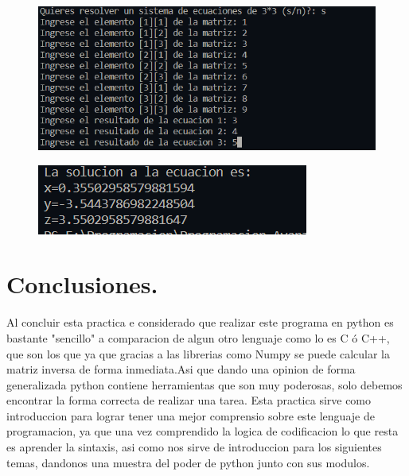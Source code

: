 \documentclass[12pt]{article}
\begin{document}
	\begin{figure}[H]
		\begin{center}
 			\includegraphics[width = .6\textwidth]{1_9.png}
		\end{center} 
	\end{figure}
	\begin{figure}[H]
		\begin{center}
 			\includegraphics[width = .6\textwidth]{1_10.png}
		\end{center} 
	\end{figure}
	
	


\section{Conclusiones.}
Al concluir esta practica e considerado que realizar este programa en python es bastante "sencillo" a comparacion de algun otro lenguaje como lo es C ó C++, que son los que ya que gracias a las librerias como Numpy se puede calcular la matriz inversa de forma inmediata.Asi que dando una opinion de forma generalizada python contiene herramientas que son muy poderosas, solo debemos encontrar la forma correcta de realizar una tarea. Esta practica sirve como introduccion  para lograr tener una mejor comprensio sobre este lenguaje de programacion, ya que una vez comprendido la logica de codificacion lo que resta es aprender la sintaxis, asi como nos sirve de introduccion para los siguientes temas, dandonos una muestra del poder de python junto con sus modulos.
\








 
\end{document}
